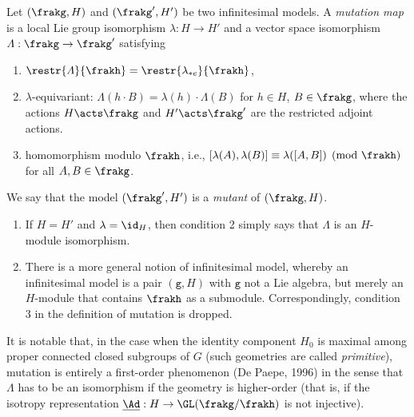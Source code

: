 \begin{defn}[Mutation]
    Let $(\frakg,H)$ and $(\frakg',H')$ be two infinitesimal models. A \emph{mutation map} is a local Lie group isomorphism $\lambda:H\to H'$ and a vector space isomorphism $\varLambda:\frakg\to \frakg'$ satisfying 
    \begin{enumerate}
        \item $\restr{\varLambda}{\frakh}=\restr{\lambda_{\ast e}}{\frakh}$,
        \item $\lambda$-equivariant: $\varLambda(h\cdot B)=\lambda(h)\cdot \varLambda(B)$ for $h\in H$, $B\in \frakg$, where the actions $H\acts \frakg$ and $H'\acts \frakg'$ are the restricted adjoint actions.
        \item homomorphism modulo $\frakh$, i.e., $[\lambda(A),\lambda(B)]\equiv \lambda([A,B])\pmod{\frakh}$ for all $A,B\in\frakg$.
    \end{enumerate}
    We say that the model $(\frakg',H')$ is a \emph{mutant} of $(\frakg,H)$.
\end{defn}

\begin{rem}
    \begin{enumerate}
        \item If $H=H'$ and $\lambda=\id_H$, then condition 2 simply says that $\varLambda$ is an $H$-module isomorphism.
        \item There is a more general notion of infinitesimal model, whereby an infinitesimal model is a pair $(\texttt{g},H)$ with $\texttt{g}$ not a Lie algebra, but merely an $H$-module that contains $\frakh$ as a submodule. Correspondingly, condition 3 in the definition of mutation is dropped. 
    \end{enumerate}
\end{rem}


\begin{rem}
    It is notable that, in the case when the identity component $H_0$ is maximal among proper connected closed subgroups of $G$ (such geometries are called \emph{primitive}), mutation is entirely a first-order phenomenon (De Paepe, 1996) in the sense that $\varLambda$ has to be an isomorphism if the geometry is higher-order (that is, if the isotropy representation $\underline{\Ad}:H\to \GL(\frakg\slash\frakh)$ is not injective).
\end{rem}

